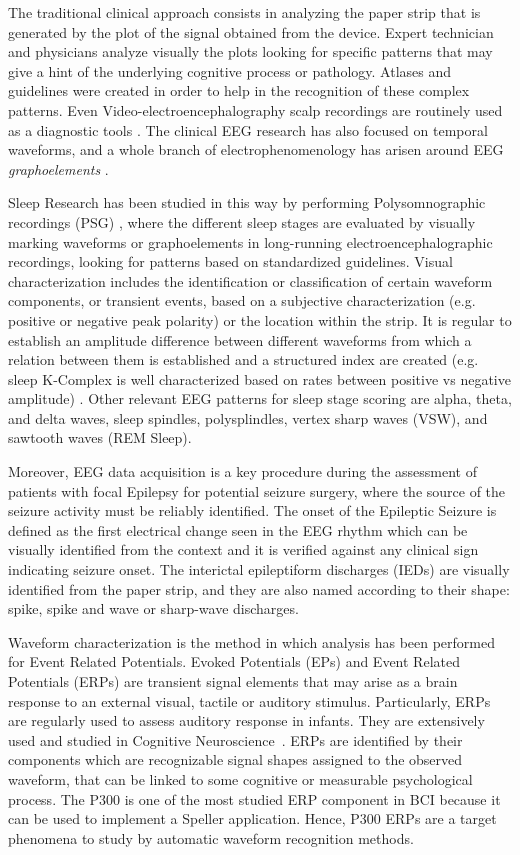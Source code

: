 \documentclass[brainsci,article,submit,moreauthors,pdftex,10pt,a4paper]{mdpi}
\begin{document}
The traditional clinical approach consists in analyzing the paper strip that is generated by the plot of the signal obtained from the device.  Expert technician and physicians analyze visually the plots looking for specific patterns that may give a hint of the underlying cognitive process or pathology.   Atlases and guidelines were created in order to help in the recognition of these complex patterns.   Even Video-electroencephalography scalp recordings are routinely used as a diagnostic tools \citep{Giagante2003} .  The clinical EEG research has also focused on temporal waveforms, and a whole branch of electrophenomenology has arisen around EEG \textit{graphoelements} \citep{Schomer2010}.  

Sleep Research has been studied in this way by performing Polysomnographic recordings (PSG)  \citep{Rodenbeck2006}, where the different sleep stages are evaluated by visually marking waveforms or graphoelements in long-running electroencephalographic recordings, looking for patterns based on standardized guidelines.   Visual characterization includes the identification or classification of certain waveform components, or transient events, based on a subjective characterization (e.g. positive or negative peak polarity) or the location within the strip.  It is regular to establish an amplitude difference between different waveforms from which a relation between them is established and a structured index are created (e.g. sleep K-Complex is well characterized based on rates between positive vs negative amplitude) \citep{Uchida1999}.  Other relevant EEG patterns for sleep stage scoring are alpha, theta, and delta waves,  sleep spindles, polysplindles, vertex sharp waves (VSW), and sawtooth waves (REM Sleep).

Moreover, EEG data acquisition is a key procedure during the assessment of patients with focal Epilepsy for potential seizure surgery, where the source of the seizure activity must be reliably identified. The onset of the Epileptic Seizure is defined as the first electrical change seen in the EEG rhythm which can be visually identified from the context and it is verified against any clinical sign indicating seizure onset.  The interictal epileptiform discharges (IEDs) are visually identified from the paper strip, and they are also named according to their shape: spike, spike and wave or sharp-wave discharges\citep{EEGIntro}.  

Waveform characterization is the method in which analysis has been performed for Event Related Potentials.  Evoked Potentials (EPs) and Event Related Potentials (ERPs) are transient signal elements that may arise as a brain response to an external visual, tactile or auditory stimulus.  Particularly, ERPs are regularly used to assess auditory response in infants.  They are extensively used and studied in Cognitive Neuroscience~\citep{Luck2005}.  ERPs are identified by their components which are recognizable signal shapes assigned to the observed waveform, that can be linked to some cognitive or measurable psychological process.   The P300 is one of the most studied ERP component in BCI because it can be used to implement a Speller application.  Hence, P300 ERPs are a target phenomena to study by automatic waveform recognition methods.
\end{document}
